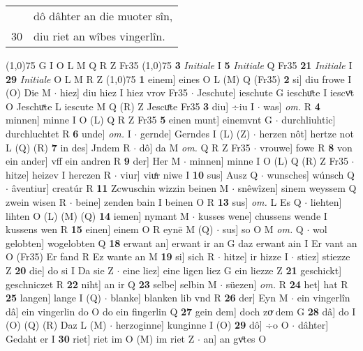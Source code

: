 \documentclass[8pt,a4paper,notitlepage]{article}
\begin{document}
\begin{table}[ht]
\begin{minipage}[t]{0.5\linewidth}
\begin{tabular}{rl}
 & dô dâhter an die muoter sîn,\\ 
30 & diu riet an wîbes vingerlîn.\\ 
\end{tabular}
\scriptsize
\line(1,0){75} \newline
G I O L M Q R Z Fr35 \newline
\line(1,0){75} \newline
\textbf{3} \textit{Initiale} I  \textbf{5} \textit{Initiale} Q Fr35  \textbf{21} \textit{Initiale} I  \textbf{29} \textit{Initiale} O L M R Z  \newline
\line(1,0){75} \newline
\textbf{1} einem] eines O L (M) Q (Fr35) \textbf{2} si] diu frowe I (O) Die M  $\cdot$ hiez] diu hiez I hiez vrov Fr35  $\cdot$ Jeschute] ieschute G ieschuͤte I iescvͦt O Jeschuͯte L iescute M Q (R) Z Jescuͤte Fr35 \textbf{3} diu] ÷iu I  $\cdot$ was] \textit{om.} R \textbf{4} minnen] minne I O (L) Q R Z Fr35 \textbf{5} einen munt] einemvnt G  $\cdot$ durchliuhtic] durchluchtet R \textbf{6} unde] \textit{om.} I  $\cdot$ gernde] Gerndes I (L) (Z)  $\cdot$ herzen nôt] hertze not L (Q) (R) \textbf{7} in des] Jndem R  $\cdot$ dô] da M \textit{om.} Q R Z Fr35  $\cdot$ vrouwe] fowe R \textbf{8} von ein ander] vff ein andren R \textbf{9} der] Her M  $\cdot$ minnen] minne I O (L) Q (R) Z Fr35  $\cdot$ hitze] heizev I herczen R  $\cdot$ viur] viuͤr niwe I \textbf{10} sus] Ausz Q  $\cdot$ wunsches] wúnsch Q  $\cdot$ âventiur] creatúr R \textbf{11} Zcwuschin wizzin beinen M  $\cdot$ snêwîzen] sinem weyssem Q zwein wisen R  $\cdot$ beine] zenden bain I beinen O R \textbf{13} sus] \textit{om.} L Es Q  $\cdot$ liehten] lihten O (L) (M) (Q) \textbf{14} iemen] nymant M  $\cdot$ kusses wene] chussens wende I kussens wen R \textbf{15} einen] einem O R eynē M (Q)  $\cdot$ sus] so O M \textit{om.} Q  $\cdot$ wol gelobten] wogelobten Q \textbf{18} erwant an] erwant ir an G daz erwant ain I Er vant an O (Fr35) Er fand R Ez wante an M \textbf{19} si] sich R  $\cdot$ hitze] ir hizze I  $\cdot$ stiez] stiezze Z \textbf{20} die] do si I Da sie Z  $\cdot$ eine liez] eine ligen liez G ein liezze Z \textbf{21} geschickt] geschniczet R \textbf{22} niht] an ir Q \textbf{23} selbe] selbin M  $\cdot$ süezen] \textit{om.} R \textbf{24} het] hat R \textbf{25} langen] lange I (Q)  $\cdot$ blanke] blanken lib vnd R \textbf{26} der] Eyn M  $\cdot$ ein vingerlîn dâ] ein vingerlin do O do ein fingerlin Q \textbf{27} gein dem] doch zoͮ dem G \textbf{28} dâ] do I (O) (Q) (R) Daz L (M)  $\cdot$ herzoginne] kunginne I (O) \textbf{29} dô] ÷o O  $\cdot$ dâhter] Gedaht er I \textbf{30} riet] riet im O (M) im riet Z  $\cdot$ an] an gvͦtes O \newline

\end{minipage}
\end{table}
\end{document}
